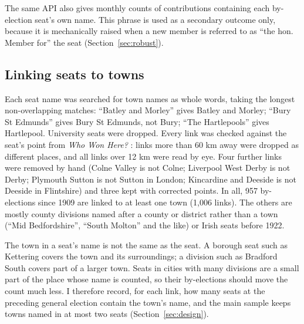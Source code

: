 \documentclass[11pt,a4paper]{article}
\begin{document}
The same API also gives monthly counts of contributions containing each by-election seat's own name. This phrase is used as a secondary outcome only, because it is mechanically raised when a new member is referred to as ``the hon. Member for'' the seat (Section~\ref{sec:robust}).

\subsection{Linking seats to towns}
Each seat name was searched for town names as whole words, taking the longest non-overlapping matches: ``Batley and Morley'' gives Batley and Morley; ``Bury St Edmunds'' gives Bury St Edmunds, not Bury; ``The Hartlepools'' gives Hartlepool. University seats were dropped. Every link was checked against the seat's point from \textit{Who Won Here?} \citep{hotham2026b}: links more than 60 km away were dropped as different places, and all links over 12 km were read by eye. Four further links were removed by hand (Colne Valley is not Colne; Liverpool West Derby is not Derby; Plymouth Sutton is not Sutton in London; Kincardine and Deeside is not Deeside in Flintshire) and three kept with corrected points. In all, 957 by-elections since 1909 are linked to at least one town (1,006 links). The others are mostly county divisions named after a county or district rather than a town (``Mid Bedfordshire'', ``South Molton'' and the like) or Irish seats before 1922.

The town in a seat's name is not the same as the seat. A borough seat such as Kettering covers the town and its surroundings; a division such as Bradford South covers part of a larger town. Seats in cities with many divisions are a small part of the place whose name is counted, so their by-elections should move the count much less. I therefore record, for each link, how many seats at the preceding general election contain the town's name, and the main sample keeps towns named in at most two seats (Section~\ref{sec:design}).
\end{document}
